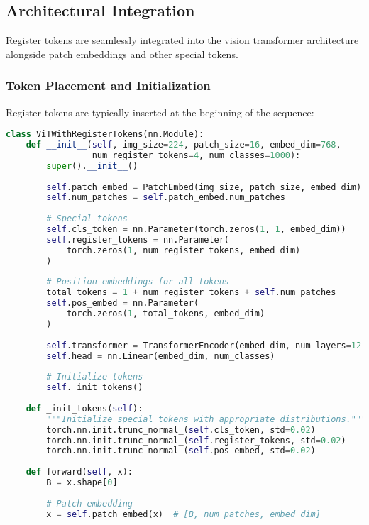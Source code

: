 \subsection{Architectural Integration}

Register tokens are seamlessly integrated into the vision transformer architecture alongside patch embeddings and other special tokens.

\subsubsection{Token Placement and Initialization}

Register tokens are typically inserted at the beginning of the sequence:

\begin{lstlisting}[language=Python, caption=Register token integration in Vision Transformer]
class ViTWithRegisterTokens(nn.Module):
    def __init__(self, img_size=224, patch_size=16, embed_dim=768, 
                 num_register_tokens=4, num_classes=1000):
        super().__init__()
        
        self.patch_embed = PatchEmbed(img_size, patch_size, embed_dim)
        self.num_patches = self.patch_embed.num_patches
        
        # Special tokens
        self.cls_token = nn.Parameter(torch.zeros(1, 1, embed_dim))
        self.register_tokens = nn.Parameter(
            torch.zeros(1, num_register_tokens, embed_dim)
        )
        
        # Position embeddings for all tokens
        total_tokens = 1 + num_register_tokens + self.num_patches
        self.pos_embed = nn.Parameter(
            torch.zeros(1, total_tokens, embed_dim)
        )
        
        self.transformer = TransformerEncoder(embed_dim, num_layers=12)
        self.head = nn.Linear(embed_dim, num_classes)
        
        # Initialize tokens
        self._init_tokens()
    
    def _init_tokens(self):
        """Initialize special tokens with appropriate distributions."""
        torch.nn.init.trunc_normal_(self.cls_token, std=0.02)
        torch.nn.init.trunc_normal_(self.register_tokens, std=0.02)
        torch.nn.init.trunc_normal_(self.pos_embed, std=0.02)
    
    def forward(self, x):
        B = x.shape[0]
        
        # Patch embedding
        x = self.patch_embed(x)  # [B, num_patches, embed_dim]
        

\end{lstlisting}
